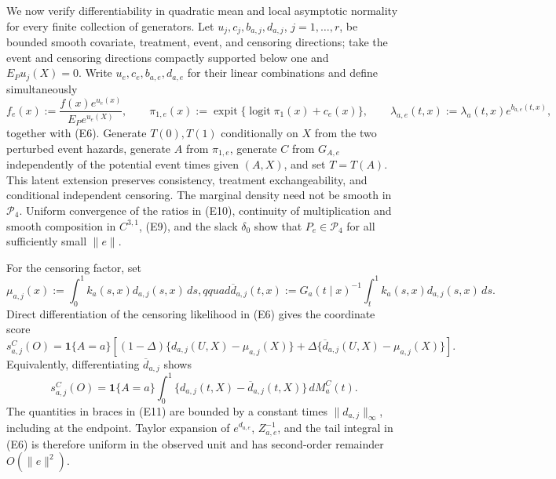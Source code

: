 We now verify differentiability in quadratic mean and local asymptotic normality for every finite collection of generators.  Let \(u_j,c_j,b_{a,j},d_{a,j}\), \(j=1,\ldots,r\), be bounded smooth covariate, treatment, event, and censoring directions; take the event and censoring directions compactly supported below one and \(E_Pu_j(X)=0\).  Write \(u_e,c_e,b_{a,e},d_{a,e}\) for their linear combinations and define simultaneously
\[
 f_e(x):=\frac{f(x)e^{u_e(x)}}{E_Pe^{u_e(X)}},\qquad
 \pi_{1,e}(x):=\operatorname{expit}\{\operatorname{logit}\pi_1(x)+c_e(x)\},
 \qquad \lambda_{a,e}(t,x):=\lambda_a(t,x)e^{b_{a,e}(t,x)},            \tag{E10}
\]
together with (E6).  Generate \(T(0),T(1)\) conditionally on \(X\) from the two perturbed event hazards, generate \(A\) from \(\pi_{1,e}\), generate \(C\) from \(G_{A,e}\) independently of the potential event times given \((A,X)\), and set \(T=T(A)\).  This latent extension preserves consistency, treatment exchangeability, and conditional independent censoring.  The marginal density need not be smooth in \(\mathcal P_4\).  Uniform convergence of the ratios in (E10), continuity of multiplication and smooth composition in \(C^{3,1}\), (E9), and the slack \(\delta_0\) show that \(P_e\in\mathcal P_4\) for all sufficiently small \(\lVert e\rVert\).

For the censoring factor, set
\[
 \mu_{a,j}(x):=\int_0^1k_a(s,x)d_{a,j}(s,x)\,ds,qquad
 \overline d_{a,j}(t,x):=G_a(t\mid x)^{-1}
                 \int_t^1k_a(s,x)d_{a,j}(s,x)\,ds.
\]
Direct differentiation of the censoring likelihood in (E6) gives the coordinate score
\[
 s^C_{a,j}(O)=\mathbf 1\{A=a\}\left[
 (1-\Delta)\{d_{a,j}(U,X)-\mu_{a,j}(X)\}
 +\Delta\{\overline d_{a,j}(U,X)-\mu_{a,j}(X)\}\right].              \tag{E11}
\]
Equivalently, differentiating \(\overline d_{a,j}\) shows
\[
 s^C_{a,j}(O)=\mathbf 1\{A=a\}\int_0^1
       \{d_{a,j}(t,X)-\overline d_{a,j}(t,X)\}\,dM_a^C(t).            \tag{E12}
\]
The quantities in braces in (E11) are bounded by a constant times \(\lVert d_{a,j}\rVert_\infty\), including at the endpoint.  Taylor expansion of \(e^{d_{a,e}}\), \(Z_{a,e}^{-1}\), and the tail integral in (E6) is therefore uniform in the observed unit and has second-order remainder \(O(\lVert e\rVert^2)\).

